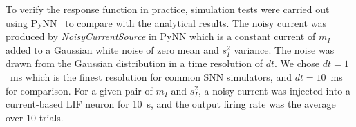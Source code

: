 \documentclass[runningheads,a4paper]{llncs}
\begin{document}

To verify the response function in practice, simulation tests were carried out using PyNN~\cite{davison2008pynn} to compare with the analytical results.
The noisy current was produced by \textit{NoisyCurrentSource} in PyNN which is a constant current of $m_I$ added to a Gaussian white noise of zero mean and $s_I^2$ variance.
The noise was drawn from the Gaussian distribution in a time resolution of $dt$.
We chose $dt=1$~ms which is the finest resolution for common SNN simulators, and $dt=10$~ms for comparison.
For a given pair of $m_I$ and $s_I^2$, a noisy current was injected into a current-based LIF neuron for 10~s, and the output firing rate was the average over 10 trials.
\end{document}

